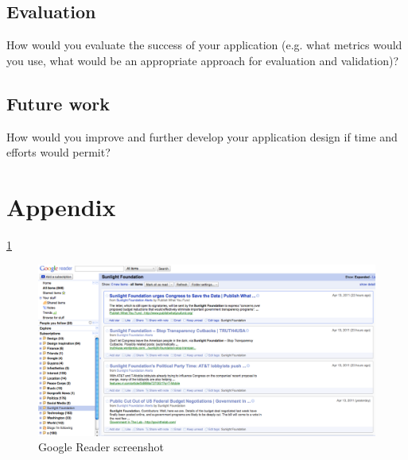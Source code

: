 \documentclass{acm_proc_10ptArticle-sp}
\begin{document}
\subsection{Evaluation}

How would you evaluate the success of your application (e.g. what metrics would you use, what would be an appropriate approach for evaluation and validation)?

\subsection{Future work}

How would you improve and further develop your application design if time  and efforts would permit?








\newpage

\onecolumn
\section{Appendix}

\ref{screenshot:reader}
\begin{figure}[H]
  \centering
  \includegraphics[width=0.9\linewidth]{img/Google-Reader.png}
  \caption{Google Reader screenshot}
  \label{screenshot:reader}
\end{figure}
\end{document}
